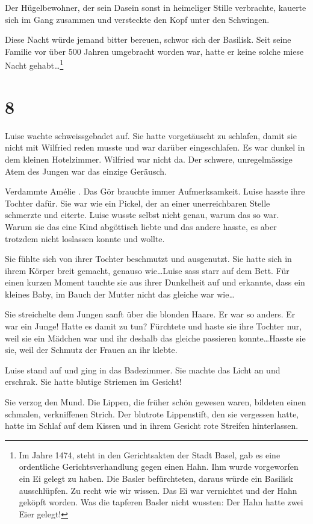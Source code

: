 \documentclass[11pt,titlepage,a5paper]{book}
\newcommand{\am}{Amélie }
\begin{document}
Der Hügelbewohner, der sein Dasein sonst in heimeliger Stille verbrachte, kauerte sich im Gang zusammen und versteckte den Kopf unter den Schwingen. 

Diese Nacht würde jemand bitter bereuen, schwor sich der Basilisk. Seit seine Familie vor über 500 Jahren umgebracht worden war, hatte er keine solche miese Nacht gehabt\dots \footnote{Im Jahre 1474, steht in den Gerichtsakten der Stadt Basel, gab es eine ordentliche Gerichtsverhandlung gegen einen Hahn. Ihm wurde vorgeworfen ein Ei gelegt zu haben. Die Basler befürchteten, daraus würde ein Basilisk ausschlüpfen. Zu recht wie wir wissen. Das Ei war vernichtet und der Hahn geköpft worden. Was die tapferen Basler nicht wussten: Der Hahn hatte zwei Eier gelegt!}

\section*{8}

Luise wachte schweissgebadet auf. Sie hatte vorgetäuscht zu schlafen, damit sie nicht mit Wilfried reden musste und war darüber eingeschlafen. Es war dunkel in dem kleinen Hotelzimmer. Wilfried war nicht da. Der schwere, unregelmässige Atem des Jungen war das einzige Geräusch.

Verdammte \am. Das Gör brauchte immer Aufmerksamkeit. Luise hasste ihre Tochter dafür. Sie war wie ein Pickel, der an einer unerreichbaren Stelle schmerzte und eiterte. Luise wusste selbst nicht genau, warum das so war. Warum sie das eine Kind abgöttisch liebte und das andere hasste, es aber trotzdem nicht loslassen konnte und wollte.

Sie fühlte sich von ihrer Tochter beschmutzt und ausgenutzt. Sie hatte sich in ihrem Körper breit gemacht, genauso wie\dots Luise sass starr auf dem Bett. Für einen kurzen Moment tauchte sie aus ihrer Dunkelheit auf und erkannte, dass ein kleines Baby, im Bauch der Mutter nicht das gleiche war wie\dots

Sie streichelte dem Jungen sanft über die blonden Haare. Er war so anders. Er war ein Junge! Hatte es damit zu tun? Fürchtete und haste sie ihre Tochter nur, weil sie ein Mädchen war und ihr deshalb das gleiche passieren konnte\dots Hasste sie sie, weil der Schmutz der Frauen an ihr klebte.

Luise stand auf und ging in das Badezimmer. Sie machte das Licht an und erschrak. Sie hatte blutige Striemen im Gesicht! 

Sie verzog den Mund. Die Lippen, die früher schön gewesen waren, bildeten einen schmalen, verkniffenen Strich. Der blutrote Lippenstift, den sie vergessen hatte, hatte im Schlaf auf dem Kissen und in ihrem Gesicht rote Streifen hinterlassen.
\end{document}
